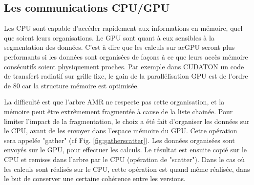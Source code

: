 



%
%
%
%


\subsection{Les communications CPU/GPU}
\label{sec:cpugpu}

Les \ac{CPU} sont capable d'accéder rapidement aux informations en mémoire, quel que soient leurs organisations.
Le \ac{GPU} sont quant à eux sensibles à la segmentation des données.
C'est à dire que les calculs sur ac{GPU} seront plus performants si les données sont organisées de façons à ce que leurs accès mémoire consécutifs soient physiquement proches.
Par exemple dans CUDATON \citep{aubert_radiative_2008} un code de transfert radiatif sur grille fixe, le gain de la parallélisation GPU est de l'ordre de 80 car la structure mémoire est optimisée.

La difficulté est que l'arbre \ac{AMR} ne respecte pas cette organisation, et la mémoire peut être extrêmement fragmentée à cause de la liste chainée.
Pour limiter l'impact de la fragmentation, le choix a été fait d'organiser les données sur le CPU, avant de les envoyer dans l'espace mémoire du GPU.
Cette opération sera appelée "gather" (cf Fig. \ref{fig:gatherscatter}).
Les données organisées sont envoyés sur le GPU, pour effectuer les calculs.
Le résultat est ensuite copié sur le CPU et remises dans l'arbre par le CPU (opération de "scatter").
Dans le cas où les calculs sont réalisés sur le CPU, cette opération est quand même réalisée, dans le but de conserver une certaine cohérence entre les versions.

